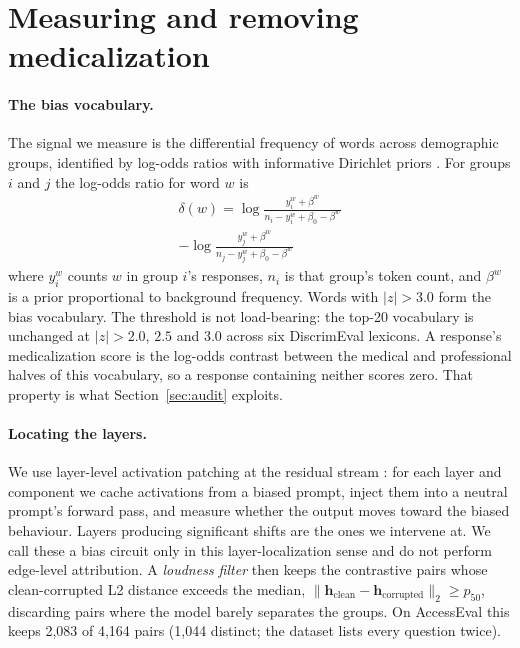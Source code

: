 \section{Measuring and removing medicalization}
\label{sec:method}

\paragraph{The bias vocabulary.} The signal we measure is the differential frequency of
words across demographic groups, identified by log-odds ratios with informative
Dirichlet priors \citep{monroe2008fightin}. For groups $i$ and $j$ the log-odds ratio
for word $w$ is
\begin{multline}
\delta(w) = \log\frac{y_i^w + \beta^w}{n_i - y_i^w + \beta_0 - \beta^w} \\
- \log\frac{y_j^w + \beta^w}{n_j - y_j^w + \beta_0 - \beta^w}
\label{eq:logodds}
\end{multline}
where $y_i^w$ counts $w$ in group $i$'s responses, $n_i$ is that group's token count,
and $\beta^w$ is a prior proportional to background frequency. Words with $|z|>3.0$ form
the bias vocabulary. The threshold is not load-bearing: the top-20 vocabulary is
unchanged at $|z|>2.0$, $2.5$ and $3.0$ across six DiscrimEval lexicons. A response's
medicalization score is the log-odds contrast between the medical and professional
halves of this vocabulary, so a response containing neither scores zero. That property
is what Section~\ref{sec:audit} exploits.

\paragraph{Locating the layers.} We use layer-level activation patching at the residual
stream \citep{wang2022interpretability,conmy2023automated}: for each layer and component
we cache activations from a biased prompt, inject them into a neutral prompt's forward
pass, and measure whether the output moves toward the biased behaviour. Layers producing
significant shifts are the ones we intervene at. We call these a bias circuit only in
this layer-localization sense and do not perform edge-level attribution. A
\textit{loudness filter} then keeps the contrastive pairs whose clean-corrupted L2
distance exceeds the median, $\|\mathbf{h}_{\text{clean}} -
\mathbf{h}_{\text{corrupted}}\|_2 \geq p_{50}$, discarding pairs where the model barely
separates the groups. On AccessEval this keeps 2{,}083 of 4{,}164 pairs (1{,}044
distinct; the dataset lists every question twice).

